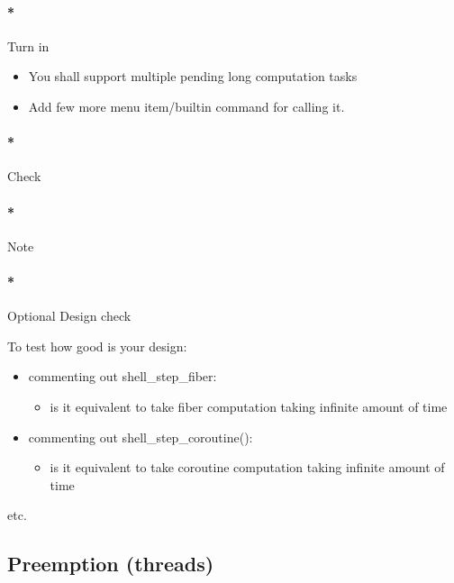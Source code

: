 \documentclass[]{article}
\providecommand{\tightlist}{%
  \setlength{\itemsep}{0pt}\setlength{\parskip}{0pt}}
\let\oldparagraph\paragraph
\renewcommand{\paragraph}[1]{\oldparagraph{#1}\mbox{}}
\begin{document}
\paragraph*{Turn in}\label{turn-in-6}

\begin{itemize}
\tightlist
\item
  You shall support multiple pending long computation tasks
\item
  Add few more menu item/builtin command for calling it.
\end{itemize}

\paragraph*{Check}\label{check-6}

\paragraph*{Note}\label{note-8}

\paragraph*{Optional Design check}\label{optional-design-check}

To test how good is your design:

\begin{itemize}
\tightlist
\item
  commenting out shell\_step\_fiber:

  \begin{itemize}
  \tightlist
  \item
    is it equivalent to take fiber computation taking infinite amount of
    time
  \end{itemize}
\item
  commenting out shell\_step\_coroutine():

  \begin{itemize}
  \tightlist
  \item
    is it equivalent to take coroutine computation taking infinite
    amount of time
  \end{itemize}
\end{itemize}

etc.

\subsection{Preemption (threads)}\label{preemption-threads}
\end{document}
